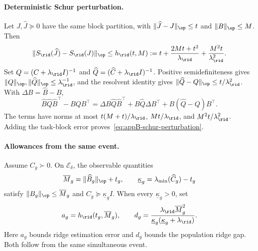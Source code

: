 \paragraph{Deterministic Schur perturbation.}
Let $J,\widehat J\succeq0$ have the same block partition, with $\lVert\widehat J-J\rVert_{\op}\le t$ and $\lVert B\rVert_{\op}\le M$. Then
\begin{equation}
\lVert S_{\rid}(\widehat J)-S_{\rid}(J)\rVert_{\op}
\le h_{\rid}(t,M):=
t+\frac{2Mt+t^2}{\lambda_{\rid}}+\frac{M^2t}{\lambda_{\rid}^2}.
\label{eq:appB-schur-perturbation}
\end{equation}
Set $Q=(C+\lambda_{\rid}I)^{-1}$ and $\widehat Q=(\widehat C+\lambda_{\rid}I)^{-1}$. Positive semidefiniteness gives $\lVert Q\rVert_{\op},\lVert\widehat Q\rVert_{\op}\le\lambda_{\rid}^{-1}$, and the resolvent identity gives $\lVert\widehat Q-Q\rVert_{\op}\le t/\lambda_{\rid}^2$. With $\Delta B=\widehat B-B$,
\begin{equation}
\widehat B\widehat Q\widehat B^\top-BQB^\top
=\Delta B\widehat Q\widehat B^\top+B\widehat Q\Delta B^\top
+B(\widehat Q-Q)B^\top.
\label{eq:appB-schur-decomposition}
\end{equation}
The terms have norms at most $t(M+t)/\lambda_{\rid}$, $Mt/\lambda_{\rid}$, and $M^2t/\lambda_{\rid}^2$. Adding the task-block error proves~\eqref{eq:appB-schur-perturbation}.

\paragraph{Allowances from the same event.}
Assume $C_g\succ0$. On $\mathcal E_\delta$, the observable quantities
\begin{equation}
\overline M_g=\lVert\widehat B_g\rVert_{\op}+t_g,
\qquad \underline\kappa_g=\lambda_{\min}(\widehat C_g)-t_g
\label{eq:appB-observable-bounds}
\end{equation}
satisfy $\lVert B_g\rVert_{\op}\le\overline M_g$ and $C_g\succeq\underline\kappa_gI$. When every $\underline\kappa_g>0$, set
\begin{equation}
a_g=h_{\rid}(t_g,\overline M_g),
\qquad d_g=\frac{\lambda_{\rid}\overline M_g^2}
{\underline\kappa_g(\underline\kappa_g+\lambda_{\rid})}.
\label{eq:appB-allowances}
\end{equation}
Here $a_g$ bounds ridge estimation error and $d_g$ bounds the population ridge gap. Both follow from the same simultaneous event.


